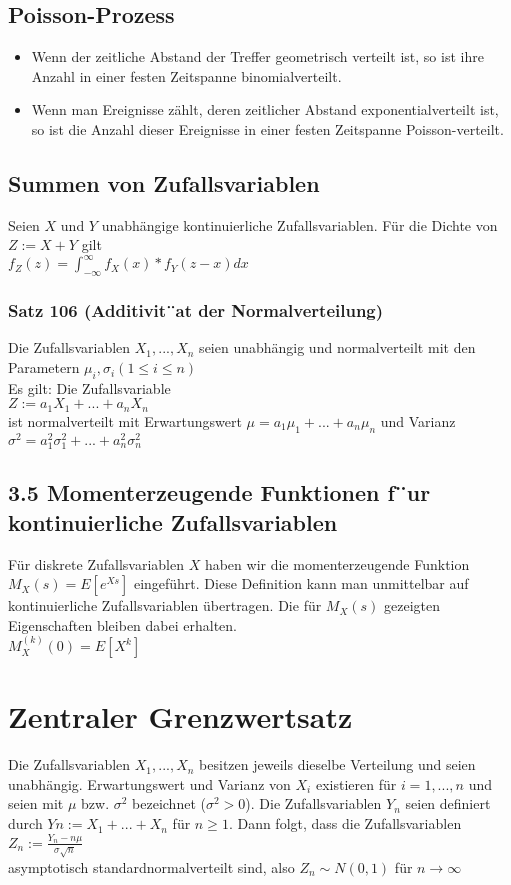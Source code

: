 \documentclass[11pt]{article}
\begin{document}
\subsection{Poisson-Prozess}
\label{sec:org626ddba}
\begin{itemize}
\item Wenn der zeitliche Abstand der Treffer geometrisch verteilt ist, so ist ihre Anzahl in einer festen Zeitspanne binomialverteilt.
\item Wenn man Ereignisse zählt, deren zeitlicher Abstand exponentialverteilt ist, so ist die Anzahl dieser Ereignisse in einer festen Zeitspanne Poisson-verteilt.
\end{itemize}

\subsection{Summen von Zufallsvariablen}
\label{sec:org6e6e519}
Seien \(X\) und \(Y\) unabhängige kontinuierliche Zufallsvariablen. Für die Dichte von \(Z := X + Y\) gilt \\
\(f_Z(z) =\int_{-\infty}^\infty f_X(x) * f_Y (z − x) dx\)
\subsubsection{Satz 106 (Additivit¨at der Normalverteilung)}
\label{sec:orgce0f9fd}
Die Zufallsvariablen \(X_1,..., X_n\) seien unabhängig und normalverteilt mit den Parametern \(\mu_i, \sigma_i (1 \leq i \leq n)\) \\
Es gilt: Die Zufallsvariable \\
\(Z := a_1X_1 + ... + a_nX_n\) \\
ist normalverteilt mit Erwartungswert \(\mu = a_1\mu_1 + ... + a_n\mu_n\) und Varianz \(\sigma^2 = a^2_1\sigma^2_1+ ... + a^2_n\sigma^2_n\)
\subsection{3.5 Momenterzeugende Funktionen f¨ur kontinuierliche Zufallsvariablen}
\label{sec:org2994678}
Für diskrete Zufallsvariablen \(X\) haben wir die momenterzeugende Funktion \\
\(M_X(s) = E[e^{Xs}]\)
eingeführt. Diese Definition kann man unmittelbar auf kontinuierliche Zufallsvariablen übertragen. Die für \(M_X(s)\) gezeigten Eigenschaften bleiben dabei erhalten. \\
\(M^{(k)}_X(0) = E[X^k]\)

\section{Zentraler Grenzwertsatz}
\label{sec:org1397f07}
Die Zufallsvariablen \(X_1, ... , X_n\) besitzen jeweils dieselbe Verteilung und seien unabhängig. Erwartungswert und Varianz von \(X_i\) existieren für \(i = 1, ... , n\) und seien mit \(\mu\) bzw. \(\sigma^2\) bezeichnet (\(\sigma^2 > 0\)).
Die Zufallsvariablen \(Y_n\) seien definiert durch \(Yn := X_1 + . . . + X_n\) für \(n \geq 1\). Dann folgt, dass die Zufallsvariablen \\
\(Z_n := \frac{Y_n − n\mu}{\sigma \sqrt{n}}\) \\
asymptotisch standardnormalverteilt sind, also \(Z_n \sim N(0, 1)\) für \(n \rightarrow \infty\)
\end{document}
